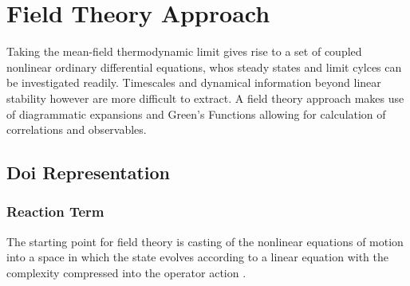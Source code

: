 \documentclass{article}[12pt]
\numberwithin{equation}{section}
\begin{document}
\section{Field Theory Approach}\vspace{-10pt}
Taking the mean-field thermodynamic limit gives rise to a set of coupled nonlinear
ordinary differential equations, whos steady states and limit cylces can be investigated
readily. Timescales and dynamical information beyond linear stability however are more
difficult to extract. A field theory approach makes use of diagrammatic expansions
and Green's Functions allowing for calculation of correlations and observables.
\vspace{-15pt}
\subsection{Doi Representation}
\vspace{-10pt}
\subsubsection{Reaction Term}
\vspace{-10pt}
The starting point for field theory is casting of the nonlinear equations of motion
into a space in which the state evolves according to a linear equation with
the complexity compressed into the operator action \cite{Doi1976}.
\end{document}
